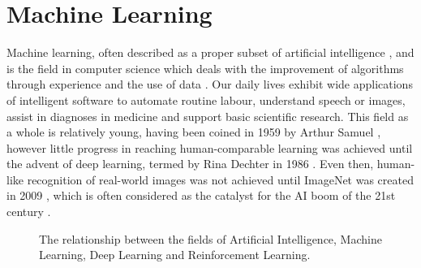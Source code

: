 \chapter{Machine Learning\label{chap:ML}}


Machine learning, often described as a proper subset of artificial
intelligence \cite{Goodfellow-et-al-2016}, and is the field in computer science
which deals with the improvement of algorithms through experience and the use of
data \cite{Mitchell97}. Our daily lives exhibit wide applications of intelligent
software to automate routine labour, understand speech or images, assist in
diagnoses in medicine and support basic scientific research. This field as a
whole is relatively young, having been coined in 1959 by Arthur Samuel
\cite{5392560}, however little progress in reaching human-comparable learning
was achieved until the advent of deep learning, termed by Rina Dechter in 1986
\cite{Rina1986}. Even then, human-like recognition of real-world images was not
achieved until ImageNet was created in 2009 \cite{5206848}, which is often
considered as the catalyst for the AI boom of the 21st century
\cite{hardy_2016}.

\begin{figure}[htp!]
    \centering
    
    \caption{
        The relationship between the fields of Artificial Intelligence,
        Machine Learning, Deep Learning and Reinforcement Learning.
    }
    \label{fig:al-ml-dl}
\end{figure}

